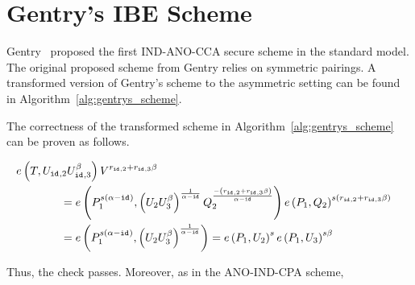 \chapter{Gentry's IBE Scheme}
\label{app:gentrys_ibe_scheme}
Gentry~\cite{art:Gentry06} proposed the first IND-ANO-CCA secure scheme in the standard model. The original proposed scheme from Gentry relies on symmetric pairings. A transformed version of Gentry's scheme to the asymmetric setting can be found in Algorithm~\ref{alg:gentrys_scheme}.

The correctness of the transformed scheme in Algorithm~\ref{alg:gentrys_scheme} can be proven as follows.

\begin{equation*}
 \begin{split}
  e \left( T, U_{\id{},2} U_{\id{},3}^{\beta} \right) V^{ r_{\id{},2} + r_{\id{},3} \beta} \\
  & \negthickspace \negthickspace \negthickspace \negthickspace \negthickspace \negthickspace \negthickspace \negthickspace \negthickspace \negthickspace \negthickspace \negthickspace \negthickspace \negthickspace \negthickspace \negthickspace\negthickspace \negthickspace \negthickspace \negthickspace \negthickspace \negthickspace \negthickspace \negthickspace \negthickspace \negthickspace \negthickspace \negthickspace \negthickspace \negthickspace \negthickspace = e \left( P_1^{s\left( \alpha - \id{} \right)}, \left( U_{2}U_{3}^{\beta} \right)^{\frac{1}{\alpha - \id{}}} Q_2^{\frac{- \left( r_{\id{},2} + r_{\id{},3} \beta \right)}{\alpha - \id{}}} \right) e \left( P_1, Q_2 \right)^{s \left( r_{\id{},2} + r_{\id{},3} \beta \right)} \\
 & \negthickspace \negthickspace \negthickspace \negthickspace \negthickspace \negthickspace \negthickspace \negthickspace \negthickspace \negthickspace \negthickspace \negthickspace \negthickspace \negthickspace \negthickspace \negthickspace \negthickspace \negthickspace \negthickspace \negthickspace \negthickspace \negthickspace \negthickspace \negthickspace \negthickspace \negthickspace \negthickspace \negthickspace \negthickspace \negthickspace \negthickspace = e \left( P_1^{s\left( \alpha - \id{} \right)}, \left( U_{2}U_{3}^{\beta} \right)^{\frac{1}{\alpha - \id{}}} \right) = e \left( P_1, U_2 \right)^s e \left( P_1, U_3\right)^{s \beta}
 \end{split}
\end{equation*}


Thus, the check passes. Moreover, as in the ANO-IND-CPA scheme,

